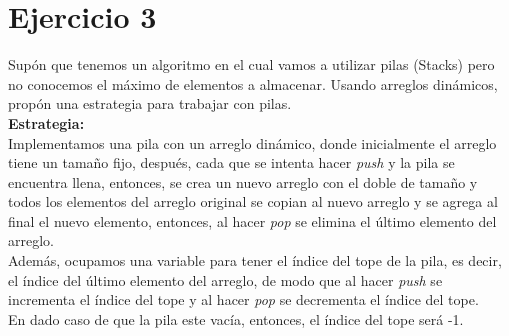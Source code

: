 \documentclass[12pt]{article}
\begin{document}
\section*{Ejercicio 3}
Supón que tenemos un algoritmo en el cual vamos a utilizar pilas (Stacks) pero no conocemos el máximo de elementos a almacenar. Usando arreglos dinámicos, propón una estrategia para trabajar con pilas.\\
\textbf{Estrategia:}\\
Implementamos una pila con un arreglo dinámico, donde inicialmente el arreglo tiene un tamaño fijo, después, cada que se intenta hacer \textit{push} y la pila se encuentra llena, entonces, se crea un nuevo arreglo con el doble de tamaño y todos los elementos del arreglo original se copian al nuevo arreglo y se agrega al final el nuevo elemento, entonces, al hacer \textit{pop} se elimina el último elemento del arreglo.\\
Además, ocupamos una variable para tener el índice del tope de la pila, es decir, el índice del último elemento del arreglo, de modo que al hacer \textit{push} se incrementa el índice del tope y al hacer \textit{pop} se decrementa el índice del tope.\\
En dado caso de que la pila este vacía, entonces, el índice del tope será -1.
\end{document}
